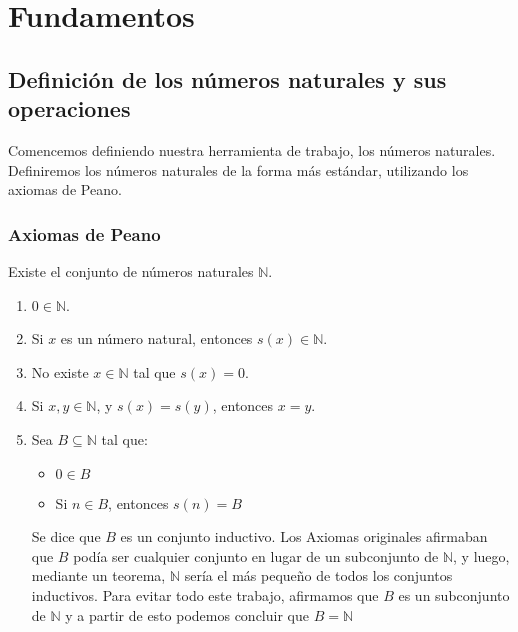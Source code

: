\documentclass{report}
\begin{document}
    \tableofcontents

    \pagebreak
    \chapter{ Fundamentos }

    \section{Definición de los números naturales y sus operaciones}
    Comencemos definiendo nuestra herramienta de trabajo, los números naturales. Definiremos los números naturales de la forma más estándar, utilizando los axiomas de Peano.

    \subsection*{Axiomas de Peano}
    Existe el conjunto de números naturales $\mathbb{N}$.
    \begin{enumerate}
        \item $0 \in \mathbb{N}$.
        \item Si $x$ es un número natural, entonces $s(x)\in \mathbb{N}$.
        \item No existe $x \in \mathbb{N}$ tal que $s(x) = 0$.
        \item Si $x,y \in \mathbb{N}$, y $s(x) = s(y)$, entonces $x=y$.
        \item Sea $B \subseteq \mathbb{N}$ tal que:
            \begin{itemize}
                \item $0 \in B$
                \item Si $n\in B$, entonces $s(n)=B$
            \end{itemize}
        \begin{noteBox}
            Se dice que $B$ es un conjunto inductivo. Los Axiomas originales afirmaban que $B$ podía ser cualquier conjunto en lugar de un subconjunto de $\mathbb{N}$, y luego, mediante un teorema, $\mathbb{N}$ sería el más pequeño de todos los conjuntos inductivos. Para evitar todo este trabajo, afirmamos que $B$ es un subconjunto de $\mathbb{N}$ y a partir de esto podemos concluir que $B = \mathbb{N}$
        \end{noteBox}
    \end{enumerate}
\end{document}
